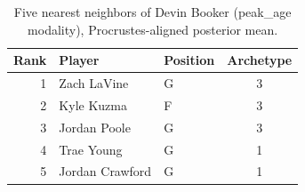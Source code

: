 \begin{table}[htbp]
  \centering\small
  \begin{tabular}{rllc}
    \toprule
    Rank & Player & Position & Archetype \\
    \midrule
    1 & Zach LaVine & G & 3 \\
    2 & Kyle Kuzma & F & 3 \\
    3 & Jordan Poole & G & 3 \\
    4 & Trae Young & G & 1 \\
    5 & Jordan Crawford & G & 1 \\
    \bottomrule
  \end{tabular}
  \caption{Five nearest neighbors of Devin Booker (peak_age modality), Procrustes-aligned posterior mean.}
  \label{tab:Devin_Booker_neighbors_peak_age}
\end{table}

